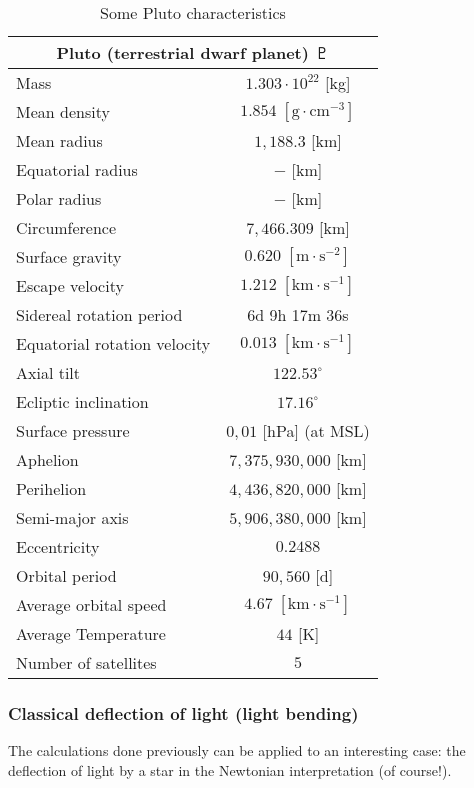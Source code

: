 	\begin{table}[H]
		\centering
		\begin{tabular}{|l|c|}
		\hline
		\multicolumn{2}{|c|}{\cellcolor[HTML]{9B9B9B}\textbf{Pluto (terrestrial dwarf planet) $\pluto$}} \\ \hline
		Mass & $1.303\cdot 10^{22}$ {[}kg{]} \\ \hline
		Mean density & $1.854\;[\text{g}\cdot \text{cm}^{-3}]$ \\ \hline
		Mean radius & $1,188.3$ {[}km{]} \\ \hline
		Equatorial radius & $-$ {[}km{]} \\ \hline
		Polar radius & $-$ {[}km{]} \\ \hline
		Circumference & $7,466.309$ {[}km{]} \\ \hline
		Surface gravity & $0.620\; [\text{m}\cdot \text{s}^{-2}]$ \\ \hline
		Escape velocity & $1.212\;[\text{km}\cdot\text{s}^{-1}]$ \\ \hline
		Sidereal rotation period & 6d 9h 17m 36s \\ \hline
		Equatorial rotation velocity & $0.013\;[\text{km}\cdot\text{s}^{-1}]$ \\ \hline
		Axial tilt & $122.53^\circ$ \\ \hline
		Ecliptic inclination & $17.16^\circ$ \\ \hline
		Surface pressure & $0,01$ {[}hPa{]} (at MSL) \\ \hline
		Aphelion & $7,375,930,000$ {[}km{]} \\ \hline
		Perihelion & $4,436,820,000$ {[}km{]} \\ \hline
		Semi-major axis & $5,906,380,000$ {[}km{]} \\ \hline
		Eccentricity & $0.2488$ \\ \hline
		Orbital period & $90,560$ {[}d{]} \\ \hline
		Average orbital speed & $4.67\;[\text{km}\cdot\text{s}^{-1}]$ \\ \hline
		Average Temperature & $44$ {[}K{]} \\ \hline
		Number of satellites & $5$ \\ \hline
		\end{tabular}
		\caption{Some Pluto characteristics}
	\end{table}

	\pagebreak
	\subsubsection{Classical deflection of light (light bending)}\label{classical deflection of light}
	The calculations done previously can be applied to an interesting case: the deflection of light by a star in the Newtonian interpretation (of course!).

